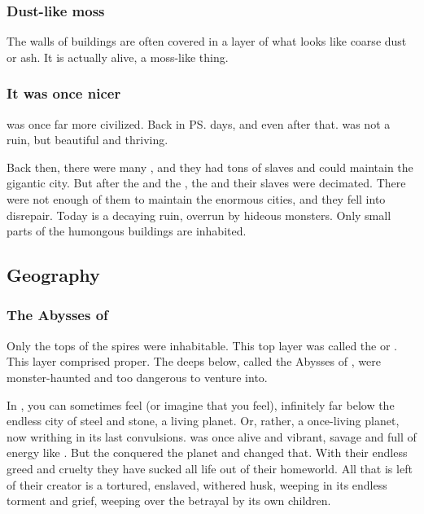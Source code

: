 \subsubsection{Dust-like moss}
The walls of \Nyxian{} buildings are often covered in a layer of what looks like coarse dust or ash. 
It is actually alive, a moss-like thing. 





\subsubsection{It was once nicer}
\Nyx{} was once far more civilized. 
Back in \ps{\Merkyrah}{} days, and even after that. 
\Nyx{} was not a ruin, but beautiful and thriving.

Back then, there were many \resphain, and they had tons of slaves and could maintain the gigantic city. 
But after the \secondbanewar{} and the \resphanwars, the \resphain{} and their slaves were decimated. 
There were not enough of them to maintain the enormous cities, and they fell into disrepair.
Today \Nyx{} is a decaying ruin, overrun by hideous monsters. 
Only small parts of the humongous buildings are inhabited. 









\subsection{Geography}





\subsubsection[The Abysses of Uluor]{The Abysses of \Ullor}
Only the tops of the spires were inhabitable. 
This top layer was called the  or . 
This layer comprised \Nyx proper.
The deeps below, called the Abysses of \Ulorr, were monster-haunted and too dangerous to venture into. 

In \Nyx, you can sometimes feel (or imagine that you feel), infinitely far below the endless city of steel and stone, a living planet. 
Or, rather, a once-living planet, now writhing in its last convulsions. 
\FatherErebos{} was once alive and vibrant, savage and full of energy like \Miith{}. 
But the \banes{} conquered the planet and changed that. 
With their endless greed and cruelty they have sucked all life out of their homeworld. 
All that is left of their creator is a tortured, enslaved, withered husk, weeping in its endless torment and grief, weeping over the betrayal by its own children. 

